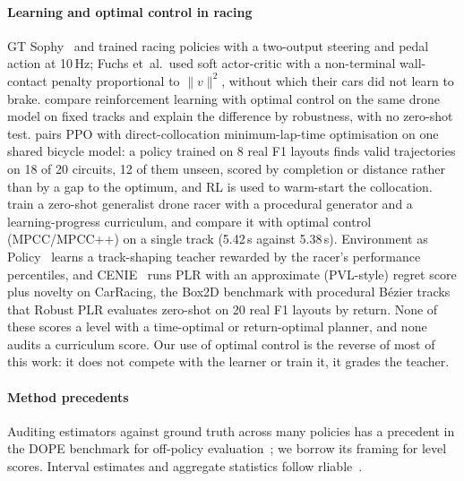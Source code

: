 \paragraph{Learning and optimal control in racing} GT Sophy~\citep{wurman2022sophy}
and \citet{fuchs2021} trained racing policies with a two-output steering and pedal
action at 10\,Hz; Fuchs et~al.\ used soft actor-critic with a non-terminal wall-contact
penalty proportional to $\lVert v\rVert^2$, without which their cars did not learn to
brake.
\citet{song2023reaching} compare reinforcement learning with optimal control on the same
drone model on fixed tracks and explain the difference by robustness, with no zero-shot
test.
\citet{hoeppke2022thesis} pairs PPO with direct-collocation minimum-lap-time optimisation
on one shared bicycle model: a policy trained on 8 real F1 layouts finds valid
trajectories on 18 of 20 circuits, 12 of them unseen, scored by completion or distance
rather than by a gap to the optimum, and RL is used to warm-start the collocation.
\citet{green2026drone} train a zero-shot generalist drone racer with a procedural
generator and a learning-progress curriculum, and compare it with optimal control
(MPCC/MPCC++) on a single track (5.42\,s against 5.38\,s).
Environment as Policy~\citep{wang2025envaspolicy} learns a track-shaping teacher rewarded
by the racer's performance percentiles, and CENIE~\citep{teoh2025cenie} runs PLR with an
approximate (PVL-style) regret score plus novelty on CarRacing, the Box2D benchmark with
procedural B\'ezier tracks that Robust PLR evaluates zero-shot on 20 real F1 layouts by
return.
None of these scores a level with a time-optimal or return-optimal planner, and none
audits a curriculum score. Our use of optimal control is the reverse of most of this work:
it does not compete with the learner or train it, it grades the teacher.

\paragraph{Method precedents} Auditing estimators against ground truth across many
policies has a precedent in the DOPE benchmark for off-policy
evaluation~\citep{fu2021dope}; we
borrow its framing for level scores. Interval estimates and aggregate statistics follow
rliable~\citep{agarwal2021rliable}.
